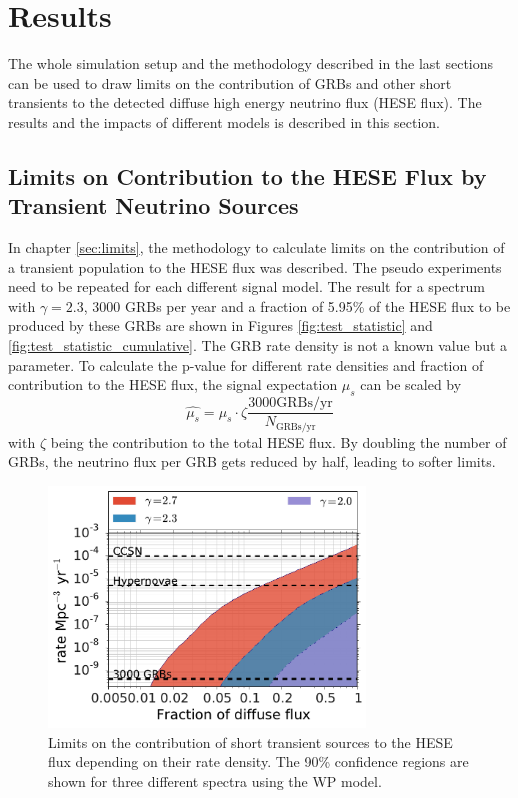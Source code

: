 \section{Results}
\label{sec:Results}
The whole simulation setup and the methodology described in the last sections 
can be used to draw limits on the contribution of GRBs and other short 
transients to the detected diffuse high energy neutrino flux (HESE flux). The 
results and the impacts of different models is described in this section.

\subsection{Limits on Contribution to the HESE Flux by Transient Neutrino 
Sources}
In chapter \ref{sec:limits}, the methodology to calculate limits on the 
contribution of a transient population to the HESE flux was described. The 
pseudo experiments need to be repeated for each different signal model. The 
result for a spectrum with $\gamma=2.3$, 3000 GRBs per year and a fraction of 
5.95\% of the HESE flux to be produced by these GRBs are shown in Figures 
\ref{fig:test_statistic} and \ref{fig:test_statistic_cumulative}. The GRB rate 
density is not a known value but a parameter. To calculate the p-value for 
different rate densities and fraction of contribution to the HESE flux, the 
signal expectation $\mu_s$ can be scaled by 
\begin{equation}
 \hat{\mu_s} = \mu_s \cdot \zeta \frac{3000\mathrm{ 
GRBs/yr}}{N_\mathrm{GRBs/yr}}
\end{equation}
with $\zeta$ being the contribution to the total HESE flux. By doubling the 
number of GRBs, the neutrino flux per GRB gets reduced by half, leading to 
softer limits.

\begin{figure}[h]
 \centering
 \captionsetup{width=.9\textwidth}
 \includegraphics[width=0.75\textwidth]{fig/limits_wp_allgammas.pdf}
\caption{Limits on the contribution of short transient sources to the HESE 
flux depending on their rate density. The 90\% confidence regions are shown for 
three different spectra using the WP model.}
\label{fig:WP_2d_limit}
\end{figure}

